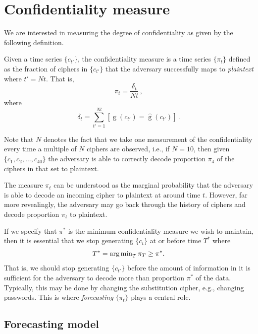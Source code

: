 \documentclass[final,
  11pt,
]{article}
\begin{document}
\section{Confidentiality measure}

We are interested in measuring the degree of confidentiality as given by
the following definition.

\begin{definition}
Given a time series $\{c_{t'}\}$, the confidentiality measure is a time series
$\{\pi_t\}$ defined as the fraction of ciphers in $\{c_{t'}\}$ that the adversary
successfully maps to \emph{plaintext} where $t' = N t$.
That is,
\begin{equation}
\label{eq:accuracy}
    \pi_t = \frac{\delta_t}{N t}\,,
\end{equation}
where
\begin{equation}
    \delta_t = \sum_{t'=1}^{N t} [\operatorname{g}(c_{t'}) = \hat{\operatorname{g}}(c_{t'})]\,.
\end{equation}
\end{definition}

Note that \(N\) denotes the fact that we take one measurement of the
confidentiality every time a multiple of \(N\) ciphers are observed,
i.e., if $N=10$, then given $\{c_1,c_2,\ldots,c_{40}\}$ the adversary
is able to correctly decode proportion $\pi_4$ of the ciphers in that
set to plaintext.

The measure \(\pi_t\) can be understood as the marginal probability that
the adversary is able to decode an incoming cipher to plaintext at
around time \(t\). However, far more revealingly, the adversary may go
back through the history of ciphers and decode proportion \(\pi_t\) to
plaintext.

If we specify that \(\pi^*\) is the minimum confidentiality measure we
wish to maintain, then it is essential that we stop generating
\(\{c_t\}\) at or before time \(T^*\) where
\[
  T^* = \operatorname{arg\,min}_{T} \pi_T \geq \pi^*.
\]
That is, we should stop generating \(\{c_{t'}\}\) before the amount of
information in it is sufficient for the adversary to decode more than
proportion \(\pi^*\) of the data. Typically, this may be done by
changing the substitution cipher, e.g., changing passwords.
This is where \emph{forecasting} \(\{\pi_t\}\) plays a central role.

\hypertarget{forecasting-model}{%
\subsection{Forecasting model}\label{forecasting-model}}
\end{document}
